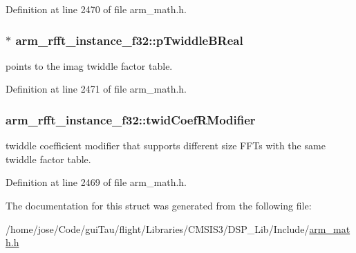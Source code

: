 Definition at line 2470 of file arm\-\_\-math.\-h.

\hypertarget{structarm__rfft__instance__f32_a23543ecfd027fea2477fe1eea23c3c4d}{
\subsubsection[{p\-Twiddle\-B\-Real}]{$\ast$ arm\-\_\-rfft\-\_\-instance\-\_\-f32\-::p\-Twiddle\-B\-Real}}\label{structarm__rfft__instance__f32_a23543ecfd027fea2477fe1eea23c3c4d}
points to the imag twiddle factor table. 

Definition at line 2471 of file arm\-\_\-math.\-h.

\hypertarget{structarm__rfft__instance__f32_aede85350fb5ae6baa1b3e8bfa15b18d6}{
\subsubsection[{twid\-Coef\-R\-Modifier}]{ arm\-\_\-rfft\-\_\-instance\-\_\-f32\-::twid\-Coef\-R\-Modifier}}\label{structarm__rfft__instance__f32_aede85350fb5ae6baa1b3e8bfa15b18d6}
twiddle coefficient modifier that supports different size F\-F\-Ts with the same twiddle factor table. 

Definition at line 2469 of file arm\-\_\-math.\-h.



The documentation for this struct was generated from the following file\-:\begin{DoxyCompactItemize}
\item 
/home/jose/\-Code/gui\-Tau/flight/\-Libraries/\-C\-M\-S\-I\-S3/\-D\-S\-P\-\_\-\-Lib/\-Include/\hyperlink{arm__math_8h}{arm\-\_\-math.\-h}\end{DoxyCompactItemize}
